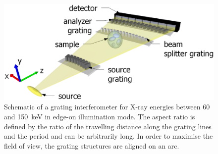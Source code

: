 \documentclass{pnastwo}
\begin{document}





\begin{figure}
    \includegraphics[width=.5\textwidth]{figures/figure1.eps}
    \caption{Schematic of a grating
        interferometer for X-ray energies between 60 and
        \SI{150}{\kilo\electronvolt} in edge-on illumination mode. The
        aspect ratio is defined by the ratio of the travelling distance along the
        grating lines and the period and can be arbitrarily long. In order to maximise
        the field of view, the grating structures are aligned on an
    arc.}
    \label{Fig:schematic}
\end{figure}
\end{document}
